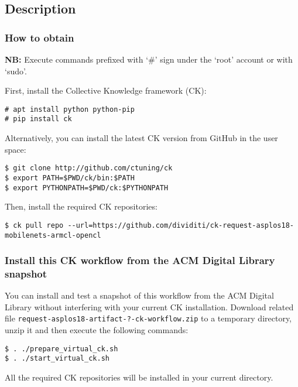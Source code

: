 \subsection{Description}

\subsubsection{How to obtain}

\textbf{NB:} Execute commands prefixed with `\#' sign under the `root' account or with `sudo'.

First, install the Collective Knowledge framework (CK):

\begin{verbatim}
# apt install python python-pip
# pip install ck
\end{verbatim}

Alternatively, you can install the latest CK version from GitHub in the user space:
\begin{verbatim}
$ git clone http://github.com/ctuning/ck
$ export PATH=$PWD/ck/bin:$PATH
$ export PYTHONPATH=$PWD/ck:$PYTHONPATH
\end{verbatim}

\noindent Then, install the required CK repositories:
\begin{verbatim}
$ ck pull repo --url=https://github.com/dividiti/ck-request-asplos18-mobilenets-armcl-opencl
\end{verbatim}

\subsubsection{Install this CK workflow from the ACM Digital Library snapshot}

You can install and test a snapshot of this workflow 
from the ACM Digital Library without interfering with your current CK installation.
Download related file {\tt request-asplos18-artifact-?-ck-workflow.zip}
to a temporary directory, unzip it and then execute the following commands:

\begin{verbatim}
$ . ./prepare_virtual_ck.sh
$ . ./start_virtual_ck.sh
\end{verbatim}

All the required CK repositories will be installed in your current directory.

